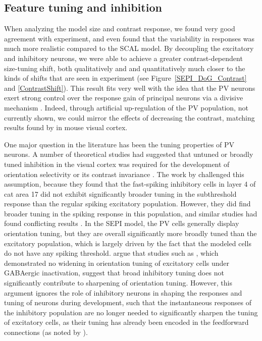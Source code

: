 \subsection{Feature tuning and inhibition}

When analyzing the model size and contrast response, we found very
good agreement with experiment, and even found that the variability in
responses was much more realistic compared to the SCAL model. By
decoupling the excitatory and inhibitory neurons, we were able to
achieve a greater contrast-dependent size-tuning shift, both
qualitatively and and quantitatively much closer to the kinds of
shifts that are seen in experiment (see Figure~\ref{SEPI_DoG_Contrast}
and \ref{ContrastShift}). This result fits very well with the idea
that the PV neurons exert strong control over the response gain of
principal neurons via a divisive mechanism \citep{Wilson2012}. Indeed,
through artificial up-regulation of the PV population, not currently
shown, we could mirror the effects of decreasing the contrast,
matching results found by \cite{Nienborg2013} in mouse visual cortex.

One major question in the literature has been the tuning properties of
PV neurons. A number of theoretical studies had suggested that untuned
or broadly tuned inhibition in the visual cortex was required for the
development of orientation selectivity or its contrast invariance
\citep{Somers1995, Troyer1998}. The work by \cite{Cardin2007}
challenged this assumption, because they found that the fast-spiking
inhibitory cells in layer 4 of cat area 17 did not exhibit
significantly broader tuning in the subthreshold response than the
regular spiking excitatory population. However, they did find broader
tuning in the spiking response in this population, and similar studies
had found conflicting results \citep{Hirsch2003, Nowak2008}. In the
SEPI model, the PV cells generally display orientation tuning, but
they are overall significantly more broadly tuned than the excitatory
population, which is largely driven by the fact that the modeled cells
do not have any spiking threshold. \cite{Cardin2007} argue that
studies such as \cite{Nelson1994}, which demonstrated no widening in
orientation tuning of excitatory cells under GABAergic inactivation,
suggest that broad inhibitory tuning does not significantly contribute
to sharpening of orientation tuning. However, this argument ignores
the role of inhibitory neurons in shaping the responses and tuning of
neurons during development, such that the instantaneous responses of
the inhibitory population are no longer needed to significantly
sharpen the tuning of excitatory cells, as their tuning has already
been encoded in the feedforward connections (as noted by
\citealt{Miikkulainen2005}).

